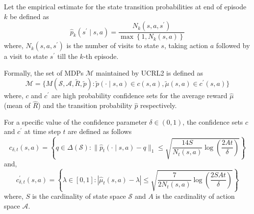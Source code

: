 Let the empirical estimate for the state transition probabilities at end of episode $k$ be defined as  
$$\hat{p}_k(s^\prime \mid s, a) = \frac{N_k(s, a, s^\prime)}{\max\left\{ 1, N_k(s,a) \right\}}$$
where, $N_k(s, a, s^\prime)$ is the number of visits to state $s$, taking action $a$ followed by a visit to state $s^\prime$ till the $k$-th episode.

Formally, the set of MDPs $\mathcal{M}$ maintained by UCRL2 is defined as
$$\mathcal{M} = \{ M(\mathcal{S}, \mathcal{A}, \tilde{R}, \tilde{p}) : \tilde{p}(\cdot \mid s, a) \in c(s, a), \tilde{\mu}(s, a) \in c^\prime(s, a)\}$$
where, $c$ and $c^\prime$ are high probability confidence sets for the average reward $\hat{\mu}$ (mean of $\hat{R}$) and the transition probability $\hat{p}$ respectively.

For a specific value of the confidence parameter $\delta \in (0,1)$, the confidence sets $c$ and $c^\prime$ at time step $t$ are defined as follows
\begin{equation}
c_{\delta, t} (s,a) = \left\{ q \in \Delta(\mathcal{S}): \| \hat{p}_t (\cdot \mid s, a) - q \|_1 \le \sqrt{ \frac{14S}{N_t(s,a)}\log\left( \frac{2At}{\delta} \right)}\right\}
\label{eq:ci_p}
\end{equation}
and,
\begin{equation}
c^\prime_{\delta, t} (s,a) = \left\{ \lambda \in [0,1]: | \hat{\mu}_t (s, a) - \lambda | \le \sqrt{ \frac{7}{2N_t(s,a)}\log\left( \frac{2SAt}{\delta} \right)}\right\}
\label{eq:ci_r}
\end{equation}
where, $S$ is the cardinality of state space $\mathcal{S}$ and $A$ is the cardinality of action space $\mathcal{A}$.

